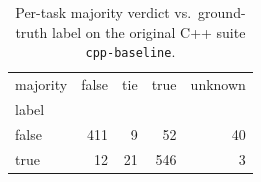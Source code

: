 \begin{table}[t]
  \centering
  \caption{Per-task majority verdict vs.\ ground-truth label on the original C++ suite \texttt{cpp-baseline}.}
  \label{tab:majority-cpp-baseline}
\begin{tabular}{lrrrr}
\toprule
majority & false & tie & true & unknown \\
label &  &  &  &  \\
\midrule
false & 411 & 9 & 52 & 40 \\
true & 12 & 21 & 546 & 3 \\
\bottomrule
\end{tabular}
\end{table}
